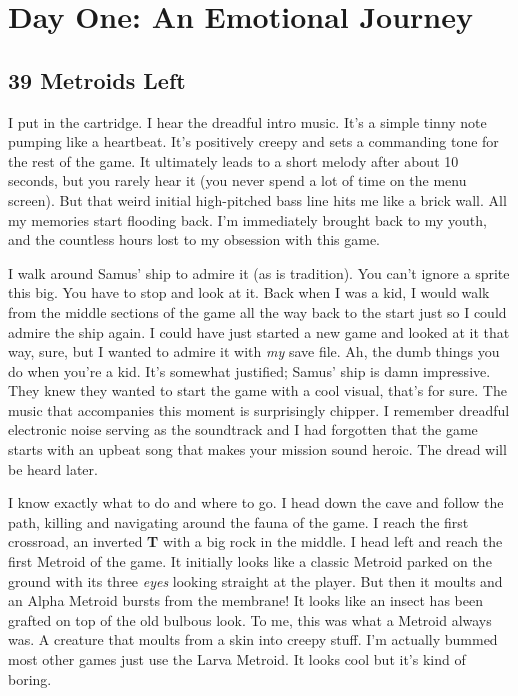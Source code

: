 \documentclass{book}
\begin{document}
\FloatBarrier\needspace{5pt}\section*{Day One: An Emotional Journey}\nopagebreak[4]

\subsection*{39 Metroids Left}\nopagebreak[4]

I put in the cartridge. I hear the dreadful intro music. It’s a simple tinny note pumping like a heartbeat. It’s positively creepy and sets a commanding tone for the rest of the game. It ultimately leads to a short melody after about 10 seconds, but you rarely hear it (you never spend a lot of time on the menu screen). But that weird initial high-pitched bass line hits me like a brick wall. All my memories start flooding back. I’m immediately brought back to my youth, and the countless hours lost to my obsession with this game.

I walk around Samus’ ship to admire it (as is tradition). You can’t ignore a sprite this big. You have to stop and look at it. Back when I was a kid, I would walk from the middle sections of the game all the way back to the start just so I could admire the ship again. I could have just started a new game and looked at it that way, sure, but I wanted to admire it with \emph{my} save file. Ah, the dumb things you do when you’re a kid. It’s somewhat justified; Samus’ ship is damn impressive. They knew they wanted to start the game with a cool visual, that’s for sure. The music that accompanies this moment is surprisingly chipper. I remember dreadful electronic noise serving as the soundtrack and I had forgotten that the game starts with an upbeat song that makes your mission sound heroic. The dread will be heard later.

I know exactly what to do and where to go. I head down the cave and follow the path, killing and navigating around the fauna of the game. I reach the first crossroad, an inverted \textbf{T} with a big rock in the middle. I head left and reach the first Metroid of the game. It initially looks like a classic Metroid parked on the ground with its three \emph{eyes} looking straight at the player. But then it moults and an Alpha Metroid bursts from the membrane! It looks like an insect has been grafted on top of the old bulbous look. To me, this was what a Metroid always was. A creature that moults from a skin into creepy stuff. I’m actually bummed most other games just use the Larva Metroid. It looks cool but it’s kind of boring.
\end{document}
